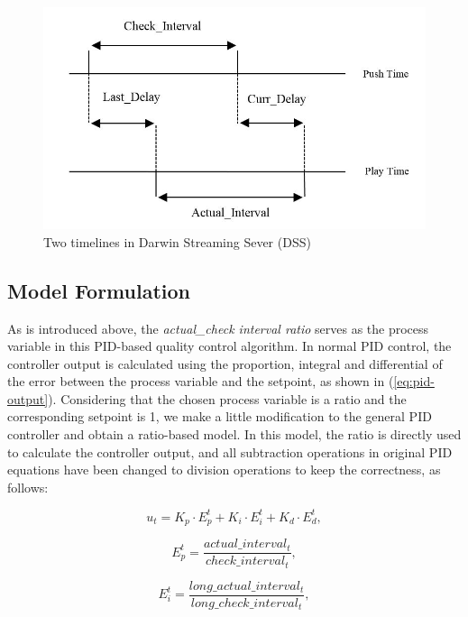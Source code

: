 \documentclass[journal]{IEEEtran}
\begin{document}
\begin{figure}[t]
\centering
\includegraphics[width = 0.9\linewidth]{Intervals.jpg}
\caption{Two timelines in Darwin Streaming Sever (DSS) \label{fig:intervals}}
\end{figure}

\subsection{Model Formulation}
\label{subsec:model-formulation}

As is introduced above, the \textit{actual\_check interval ratio} serves as the process variable in this PID-based quality control algorithm. In normal PID control, the controller output is calculated using the proportion, integral and differential of the error between the process variable and the setpoint, as shown in (\ref{eq:pid-output}). Considering that the chosen process variable is a ratio and the corresponding setpoint is 1, we make a little modification to the general PID controller and obtain a ratio-based model. In this model, the ratio is directly used to calculate the controller output, and all subtraction operations in original PID equations have been changed to division operations to keep the correctness, as follows:

\begin{equation}
\label{eq:ut}
{u_t} = {K_p} \cdot E_p^t + {K_i} \cdot E_i^t + {K_d} \cdot E_d^t ,
\end{equation}

\begin{equation}
\label{eq:ep}
E_p^t = \frac{{actual\_interva{l_t}}}{{check\_interva{l_t}}} ,
\end{equation}

\begin{equation}
\label{eq:ei}
E_i^t = \frac{{long\_actual\_interva{l_t}}}{{long\_check\_interva{l_t}}} ,
\end{equation}
\end{document}
